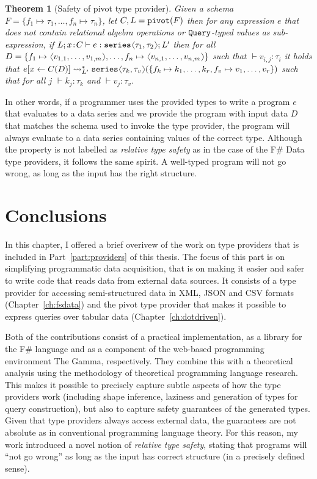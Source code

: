 \documentclass[fleqn,11pt]{report}
\newcommand{\ident}[1]{\textnormal{\ttfamily #1}}
\newcommand{\langl}{\begin{picture}(4.5,7)
\put(1.1,2.5){\rotatebox{60}{\line(1,0){5.5}}}
\put(1.1,2.5){\rotatebox{300}{\line(1,0){5.5}}}
\end{picture}}
\newcommand{\rangl}{\begin{picture}(4.5,7)
\put(.9,2.5){\rotatebox{120}{\line(1,0){5.5}}}
\put(.9,2.5){\rotatebox{240}{\line(1,0){5.5}}}
\end{picture}}
\newcommand{\vect}[1]{\langl #1 \rangl}
\newtheorem{theorem}{Theorem}
\theoremstyle{definition}
\begin{document}
\begin{theorem}[Safety of pivot type provider]
\label{thm:pivot-safe}
Given a schema $F=\{f_1\mapsto\tau_1, \ldots, f_n\mapsto\tau_n \}$, let $C,L=\ident{pivot}(F)$ then for any
expression $e$ that does not contain relational algebra operations or $\ident{Query}$-typed values as sub-expression,
if $L;x\!:\!C \vdash e : \ident{series}\langl\tau_1,\tau_2\rangl; L'$ then for all $D =
\{ f_1\mapsto\vect{v_{1,1},\ldots,v_{1,m}}, \ldots, f_n\mapsto\vect{v_{n,1},\ldots,v_{n,m}} \}$
such that $\vdash v_{i, j} : \tau_i$ it holds that $e[x\leftarrow C(D)]\leadsto_{L'}^{*}
  \ident{series}\langl\tau_k,\tau_v\rangl(\{ f_k\mapsto{k_1,\ldots,k_r}, f_v\mapsto{v_1,\ldots,v_r} \})$
  such that for all $j$ $\vdash k_j : \tau_k$ and $\vdash v_j : \tau_v$.
\end{theorem}

In other words, if a programmer uses the provided types to write a program $e$ that evaluates to
a data series and we provide the program with input data $D$ that matches the schema used to invoke
the type provider, the program will always evaluate to a data series containing values of the
correct type. Although the property is not labelled as \emph{relative type safety} as in the
case of the F\# Data type providers, it follows the same spirit. A well-typed program will not
go wrong, as long as the input has the right structure.

\section{Conclusions}
In this chapter, I offered a brief overivew of the work on type providers that is included in
Part~\ref{part:providers} of this thesis. The focus of this part is on simplifying programmatic
data acquisition, that is on making it easier and safer to write code that reads data from external
data sources. It consists of a type provider for accessing semi-structured data in XML, JSON and
CSV formats (Chapter~\ref{ch:fsdata}) and the pivot type provider that makes it possible to
express queries over tabular data (Chapter~\ref{ch:dotdriven}).

Both of the contributions consist of a practical implementation, as a library for the F\# language and
as a component of the web-based programming environment The Gamma, respectively. They combine this
with a theoretical analysis using the methodology of theoretical programming language research.
This makes it possible to precisely capture subtle aspects of how the type providers work
(including shape inference, laziness and generation of types for query construction), but also
to capture safety guarantees of the generated types. Given that type providers always access
external data, the guarantees are not absolute as in conventional programming language theory.
For this reason, my work introduced a novel notion of \emph{relative type safety}, stating that
programs will ``not go wrong'' as long as the input has correct structure (in a precisely defined
sense).
\end{document}
